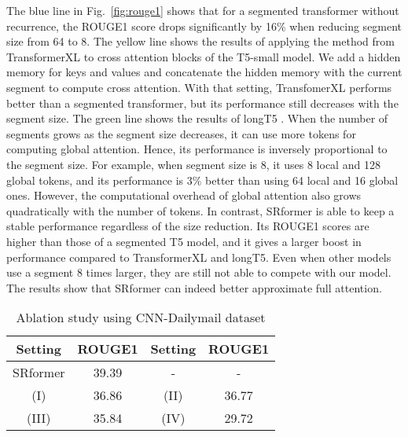 \documentclass[11pt]{article}
\begin{document}
The blue line in Fig.~\ref{fig:rouge1} shows that for a segmented transformer without recurrence, the ROUGE1 score drops significantly by 16\% when reducing segment size from 64 to 8.  The yellow line shows the results of applying the method from TransformerXL \citep{transformerxl} to cross attention blocks of the T5-small model.
We add a hidden memory for keys and values  and concatenate the hidden memory with the current segment to compute cross attention. With that setting, TransfomerXL performs better than a segmented transformer, but its performance still decreases with the segment size. The green line shows the results of longT5 \cite{longt5}. When the number of segments grows as the segment size decreases, it can use more tokens for computing global attention. Hence, its performance is inversely proportional to the segment size. For example, when segment size is 8, it uses 8 local and 128 global tokens, and its performance is 3\% better than using 64 local and 16 global ones. However, the computational overhead of global attention also grows quadratically with the number of tokens. In contrast, SRformer is able to keep a stable performance regardless of the size reduction. Its ROUGE1 scores are  higher than those of a segmented T5 model, and it gives a larger boost in performance compared to TransformerXL and longT5. Even when other models use a segment 8 times larger, they are still not able to compete with our model. The results show that SRformer can indeed better approximate full attention.
\begin{table}[h]
    \centering
    \begin{tabular}{c|c|c|c}
       \hline
       Setting  &  ROUGE1 & Setting  &  ROUGE1\\
       \hline
       SRformer & 39.39 & -& -\\
        (I) & 36.86 & (II) & 36.77 \\
        (III) &  35.84 & (IV) &  29.72\\
       \hline
    \end{tabular}
    \caption{Ablation study using CNN-Dailymail dataset}
    \label{tab:ablation}
\end{table}
\end{document}
